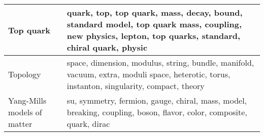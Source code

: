 \begin{longtable}[H]{p{}|p{}}
Top quark                                           &                                                       quark, top, top quark, mass, decay, bound, standard model, top quark mass, coupling, new physics, lepton, top quarks, standard, chiral quark, physic \\ \midrule
Topology                                            &                                                                space, dimension, modulus, string, bundle, manifold, vacuum, extra, moduli space, heterotic, torus, instanton, singularity, compact, theory \\ \midrule
Yang-Mills models of matter                         &                                                                                       su, symmetry, fermion, gauge, chiral, mass, model, breaking, coupling, boson, flavor, color, composite, quark, dirac \\ \midrule
\end{longtable}
